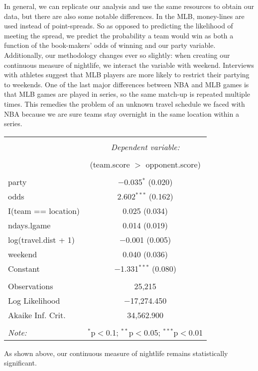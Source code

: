 \documentclass[letterpaper,12pt]{article}
\begin{document}
In general, we can replicate our analysis and use the same resources to obtain our data,
 but there are also some notable differences.
In the MLB, money-lines
are used instead of point-spreads. So as opposed to predicting
the likelihood of meeting the spread, we predict the probability
a team would win as both a function of the book-makers'
odds of winning and our party variable. 
Additionally, our methodology changes ever so slightly: when creating our
continuous measure of nightlife, we interact the variable with weekend. Interviews with athletes suggest that MLB players are more likely to
restrict their partying to weekends.
One of the last major differences between NBA and MLB games is that MLB games
are played in series, so the same match-up is repeated multiple times. This remedies
the problem of an unknown travel schedule we faced with NBA because we are sure 
teams stay overnight in the same location within a series.

\begin{tabular}{@{\extracolsep{5pt}}lc}  \\[-1.8ex]\hline  \hline \\[-1.8ex]   & \multicolumn{1}{c}{\textit{Dependent variable:}} \\  \cline{2-2}  \\[-1.8ex] & (team.score $ > $ opponent.score) \\  \hline \\[-1.8ex]   party & $-$0.035$^{*}$ (0.020) \\    odds & 2.602$^{***}$ (0.162) \\    I(team == location) & 0.025 (0.034) \\    ndays.lgame & 0.014 (0.019) \\    log(travel.dist + 1) & $-$0.001 (0.005) \\    weekend & 0.040 (0.036) \\    Constant & $-$1.331$^{***}$ (0.080) \\   \hline \\[-1.8ex]  Observations & 25,215 \\  Log Likelihood & $-$17,274.450 \\  Akaike Inf. Crit. & 34,562.900 \\  \hline  \hline \\[-1.8ex]  \textit{Note:}  & \multicolumn{1}{r}{$^{*}$p$<$0.1; $^{**}$p$<$0.05; $^{***}$p$<$0.01} \\  \end{tabular} 

As shown above, our continuous measure of nightlife remains statistically significant.
\end{document}

